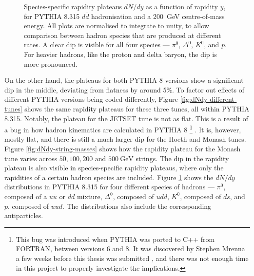 \documentclass[12pt,a4paper]{report}
\begin{document}

\begin{figure}
  \centering
  
  \caption{Species-specific rapidity plateaus $dN/dy$ as a function of rapidity $y$, for PYTHIA 8.315 $d\bar{d}$ hadronisation and a \qty{200}{\giga\electronvolt} centre-of-mass energy. \protect\footnotemark All plots are normalised to integrate to unity, to allow comparison between hadron species that are produced at different rates. A clear dip is visible for all four species --- $\pi^0$, $\Delta^0$, $K^0$, and $p$. For heavier hadrons, like the proton and delta baryon, the dip is more pronounced.}
  \label{fig:species-specific}
\end{figure}


On the other hand, the plateaus for both PYTHIA 8 versions show a significant dip in the middle, deviating from flatness by around 5\%. To factor out effects of different PYTHIA versions being coded differently, Figure \ref{fig:dNdy-different-tunes} shows the same rapidity plateaus for these three tunes, all within PYTHIA 8.315. Notably, the plateau for the JETSET tune is not as flat. This is a result of a bug in how hadron kinematics are calculated in PYTHIA 8 \footnote{This bug was introduced when PYTHIA was ported to C++ from FORTRAN, between versions 6 and 8. It was discovered by Stephen Mrenna a few weeks before this thesis was submitted \cite{steve}, and there was not enough time in this project to properly investigate the implications.} \cite{steve}. It is, however, mostly flat, and there is still a much larger dip for the Hoeth and Monash tunes. Figure \ref{fig:dNdy-string-masses} shows how the rapidity plateau for the Monash tune varies across $50, 100, 200 \text{ and } \qty{500}{\giga\electronvolt}$ strings. The dip in the rapidity plateau is also visible in species-specific rapidity plateaus, where only the rapidities of a certain hadron species are included. Figure \ref{fig:species-specific} shows the $dN/dy$ distributions in PYTHIA 8.315 for four different species of hadrons --- $\pi^0$, composed of a $u\bar{u}$ or $d\bar{d}$ mixture, $\Delta^0$, composed of $udd$, $K^0$, composed of $d\bar{s}$, and $p$, composed of $uud$. The distributions also include the corresponding antiparticles.
\end{document}
